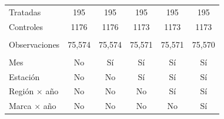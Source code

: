 \begin{tabular}{lccccc}
   Tratadas             & 195             & 195     & 195     & 195           & 195\\  
   Controles            & 1176            & 1176    & 1173    & 1173          & 1173\\  
    \\
   Observaciones        & 75,574          & 75,574  & 75,571  & 75,571        & 75,570\\  
    \\
   Mes                  & No              & Sí      & Sí      & Sí            & Sí\\  
   Estación             & No              & No      & Sí      & Sí            & Sí\\  
   Región $\times$ año  & No              & No      & No      & Sí            & Sí\\  
   Marca $\times$ año   & No              & No      & No      & No            & Sí\\  
   \bottomrule
\end{tabular}
\par\endgroup


